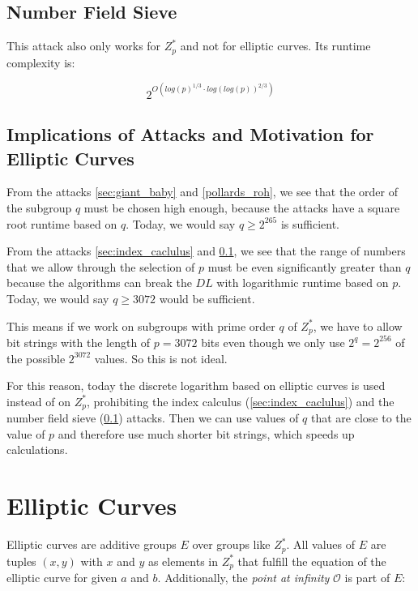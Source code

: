 \subsection{Number Field Sieve}\label{sec:number_field_sieve}

This attack also only works for $Z_p^*$ and not for elliptic curves.
Its runtime complexity is:

$$
    2^{O(log(p)^{1/3} \cdot log(log(p))^{2/3})}
$$


\subsection{Implications of Attacks and Motivation for Elliptic Curves}

From the attacks \ref{sec:giant_baby} and \ref{pollards_roh}, we see that the order of the subgroup $q$ must be chosen high enough, because the attacks have a square root runtime based on $q$. Today, we would say $q \geq 2^265$ is sufficient.

From the attacks \ref{sec:index_caclulus} and \ref{sec:number_field_sieve}, we see that the range of numbers that we allow through the selection of $p$ must be even significantly greater than $q$ because the algorithms can break the $DL$ with logarithmic runtime based on $p$. Today, we would say $q \geq 3072$ would be sufficient.

This means if we work on subgroups with prime order $q$ of $Z_p^*$, we have to allow bit strings with the length of $p = 3072$ bits even though we only use $2^q = 2^{256}$ of the possible $2^{3072}$ values.
So this is not ideal.

For this reason, today the discrete logarithm based on elliptic curves is used instead of on $Z_p^*$, prohibiting the index calculus (\ref{sec:index_caclulus}) and the number field sieve (\ref{sec:number_field_sieve}) attacks.
Then we can use values of $q$ that are close to the value of $p$ and therefore use much shorter bit strings, which speeds up calculations.


\section{Elliptic Curves}\label{sec:ell_curves}

Elliptic curves are additive groups $E$ over groups like $Z_p^*$.
All values of $E$ are tuples $(x,y)$ with $x$ and $y$ as elements in $Z_p^*$ that fulfill the equation of the elliptic curve for given $a$ and $b$. Additionally, the \textit{point at infinity} $\mathcal{O}$ is part of $E$:

